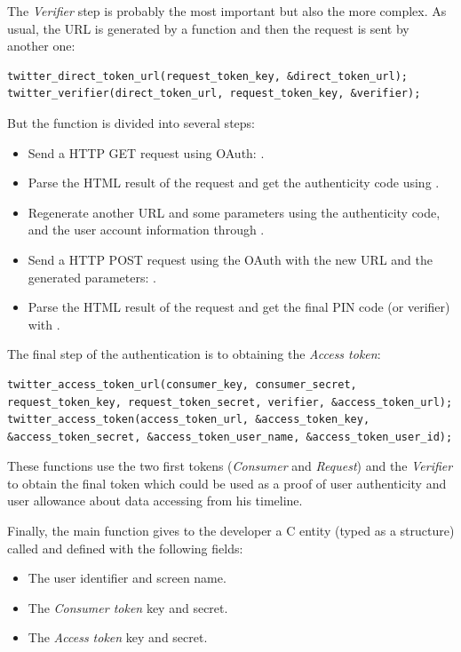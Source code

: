 The \textit{Verifier} step is probably the most important but also the more complex. As usual, the URL is generated by a function and then the request is sent by another one:
\begin{lstlisting}
twitter_direct_token_url(request_token_key, &direct_token_url);
twitter_verifier(direct_token_url, request_token_key, &verifier);
\end{lstlisting}
But the  function is divided into several steps:
\begin{itemize}
\item Send a HTTP GET request using OAuth: .
\item Parse the HTML result of the request and get the authenticity code using .
\item Regenerate another URL and some parameters using the authenticity code, and the user account information through .
\item Send a HTTP POST request using the OAuth with the new URL and the generated parameters: .
\item Parse the HTML result of the request and get the final PIN code (or verifier) with .
\end{itemize}

The final step of the authentication is to obtaining the \textit{Access token}:
\begin{lstlisting}
twitter_access_token_url(consumer_key, consumer_secret, request_token_key, request_token_secret, verifier, &access_token_url);
twitter_access_token(access_token_url, &access_token_key, &access_token_secret, &access_token_user_name, &access_token_user_id);
\end{lstlisting}
These functions use the two first tokens (\textit{Consumer} and \textit{Request}) and the \textit{Verifier} to obtain the final token which could be used as a proof of user authenticity and user allowance about data accessing from his timeline.

Finally, the main function gives to the developer a C entity (typed as a structure) called  and defined with the following fields:
\begin{itemize}
\item The user identifier and screen name.
\item The \textit{Consumer token} key and secret.
\item The \textit{Access token} key and secret.
\end{itemize}


